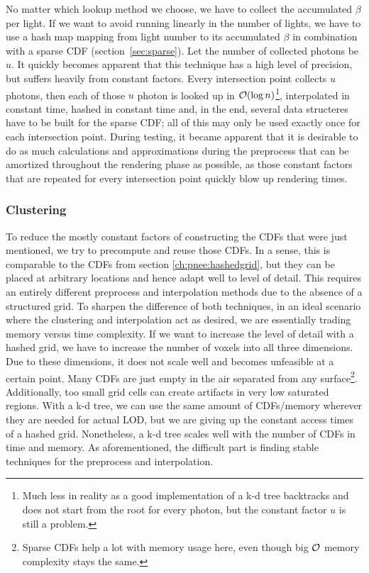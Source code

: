 No matter which lookup method we choose, we have to collect the accumulated $\beta$ per light. If we want to avoid running linearly in the number of lights, we have to use a hash map mapping from light number to its accumulated $\beta$ in combination with a sparse CDF (section~\ref{sec:sparse}). Let the number of collected photons be $u$. It quickly becomes apparent that this technique has a high level of precision, but suffers heavily from constant factors. Every intersection point collects $u$ photons, then each of those $u$ photon is looked up in $\mathcal{O}(\log n)$\footnote{Much less in reality as a good implementation of a k-d tree backtracks and does not start from the root for every photon, but the constant factor $u$ is still a problem.}, interpolated in constant time, hashed in constant time and, in the end, several data structeres have to be built for the sparse CDF; all of this may only be used exactly once for each intersection point. During testing, it became apparent that it is desirable to do as much calculations and approximations during the preprocess that can be amortized throughout the rendering phase as possible, as those constant factors that are repeated for every intersection point quickly blow up rendering times.

\subsubsection{Clustering}

To reduce the mostly constant factors of constructing the CDFs that were just mentioned, we try to precompute and reuse those CDFs. In a sense, this is comparable to the CDFs from section \ref{ch:pnee:hashedgrid}, but they can be placed at arbitrary locations and hence adapt well to level of detail. This requires an entirely different preprocess and interpolation methods due to the absence of a structured grid. To sharpen the difference of both techniques, in an ideal scenario where the clustering and interpolation act as desired, we are essentially trading memory versus time complexity. If we want to increase the level of detail with a hashed grid, we have to increase the number of voxels into all three dimensions. Due to these dimensions, it does not scale well and becomes unfeasible at a certain point. Many CDFs are just empty in the air separated from any surface\footnote{Sparse CDFs help a lot with memory usage here, even though big $\mathcal{O}$ memory complexity stays the same.}. Additionally, too small grid cells can create artifacts in very low saturated regions. With a k-d tree, we can use the same amount of CDFs/memory wherever they are needed for actual LOD, but we are giving up the constant access times of a hashed grid. Nonetheless, a k-d tree scales well with the number of CDFs in time and memory. As aforementioned, the difficult part is finding stable techniques for the preprocess and interpolation.

